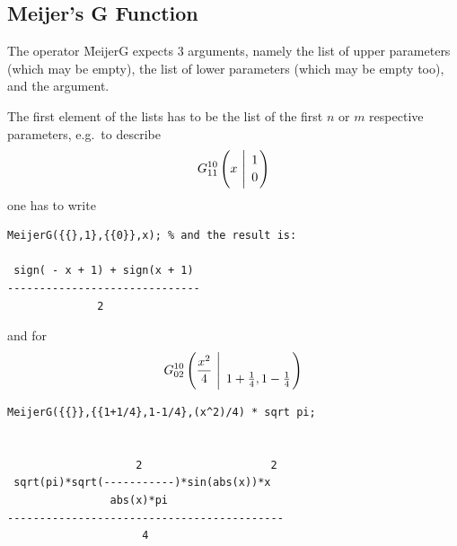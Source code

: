 \subsection{Meijer's G Function}
\hypertarget{operator:MEIJERG}{}

The operator \f{MeijerG} expects 3 arguments, namely the 
list of upper parameters (which may be empty), the list of lower
parameters (which may be empty too), and the argument.

The first element of the lists has to be the list of the
first $n$ or $m$ respective parameters, e.g.\ to describe 
\[
G_{1 1}^{1 0} \left( x \  \Bigg\vert \  \genfrac{}{}{0pt}{}{1}{0} \right)
\]
one has to write 
\begin{verbatim}
MeijerG({{},1},{{0}},x); % and the result is:

 sign( - x + 1) + sign(x + 1)
------------------------------
              2
\end{verbatim}
and for
\[
G_{0 2}^{1 0} \left( \frac{x^2}{4} \  \Bigg\vert \ \genfrac{}{}{0pt}{}{}{{1+ \frac{1}{4} },
{1-\frac{1}{4}}} \right)
\]
\begin{verbatim}
MeijerG({{}},{{1+1/4},1-1/4},(x^2)/4) * sqrt pi;


                    2                    2
 sqrt(pi)*sqrt(-----------)*sin(abs(x))*x
                abs(x)*pi
-------------------------------------------
                     4
\end{verbatim}

